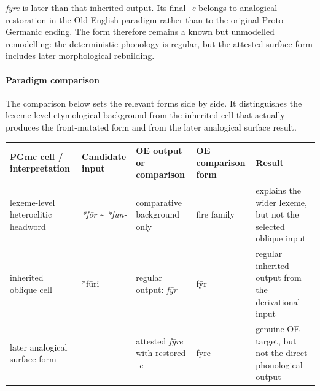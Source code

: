\documentclass[
  british,
  a4paper,
]{article}
\newcounter{none} %
\begin{document}
\emph{fȳre} is later than that inherited output. Its final \emph{-e}
belongs to analogical restoration in the Old English paradigm rather
than to the original Proto-Germanic ending. The form therefore remains a
known but unmodelled remodelling: the deterministic phonology is
regular, but the attested surface form includes later morphological
rebuilding.

\paragraph{Paradigm comparison}\label{paradigm-comparison-28}

The comparison below sets the relevant forms side by side. It
distinguishes the lexeme-level etymological background from the
inherited cell that actually produces the front-mutated form and from
the later analogical surface result.

{\def\LTcaptype{none} %
\begin{longtable}[]{@{}
  >{\raggedright\arraybackslash}p{}
  >{\raggedright\arraybackslash}p{}
  >{\raggedright\arraybackslash}p{}
  >{\raggedright\arraybackslash}p{}
  >{\raggedright\arraybackslash}p{}@{}}
\toprule\noalign{}
\begin{minipage}[b]{\linewidth}\raggedright
PGmc cell / interpretation
\end{minipage} & \begin{minipage}[b]{\linewidth}\raggedright
Candidate input
\end{minipage} & \begin{minipage}[b]{\linewidth}\raggedright
OE output or comparison
\end{minipage} & \begin{minipage}[b]{\linewidth}\raggedright
OE comparison form
\end{minipage} & \begin{minipage}[b]{\linewidth}\raggedright
Result
\end{minipage} \\
\midrule\noalign{}
\endhead
\bottomrule\noalign{}
\endlastfoot
lexeme-level heteroclitic headword & \emph{*fōr} \textasciitilde{}
\emph{*fun-} & comparative background only & fire family & explains the
wider lexeme, but not the selected oblique input \\
inherited oblique cell & *fūri & regular output: \emph{fȳr} & fȳr &
regular inherited output from the derivational input \\
later analogical surface form & --- & attested \emph{fȳre} with restored
\emph{-e} & fȳre & genuine OE target, but not the direct phonological
output \\
\end{longtable}
}
\end{document}
